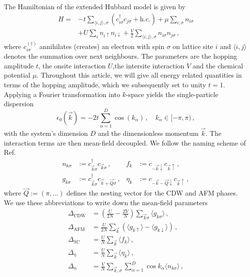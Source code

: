 \documentclass[iicol,sn-mathphys,Numbered]{sn-jnl}%
\theoremstyle{thmstyleone}%
\theoremstyle{thmstyletwo}%
\theoremstyle{thmstylethree}%
\begin{document}
The Hamiltonian of the extended Hubbard model is given by
\begin{equation}
    \begin{aligned}
        H = &-t \sum_{\langle i, j \rangle, \sigma} \left( c_{i\sigma}^\dagger c_{j\sigma} + \text{h.c.} \right) 
        + \mu \sum_{i,\sigma} n_{i\sigma} \\
        &+ U \sum_{i} n_{i\uparrow} n_{i\downarrow} 
        + \frac{V}{2} \sum_{\langle i, j\rangle, \sigma} n_{i\sigma} n_{j\sigma}\,,
    \end{aligned}
\end{equation}
where $c_{i\sigma}^{(\dagger)}$ annihilates (creates) an electron with spin $\sigma$ on lattice site $i$ and $\langle i, j\rangle$ denotes the summation over next neighbours.
The parameters are the hopping amplitude $t$, the onsite interaction $U$,the intersite interaction $V$ and the chemical potential $\mu$.
Throughout this article, we will give all energy related quantities in terms of the hopping amplitude, which we subsequently set to unity $t=1$.
Applying a Fourier transformation into $k$-space yields the single-particle dispersion 
\begin{equation}
    \epsilon_0 (\vec{k}) = -2t \sum_{\alpha=1}^D \cos(k_\alpha)\,,\quad k_\alpha \in [-\pi, \pi)\,,
\end{equation}
with the system's dimension $D$ and the dimensionless momentum $\vec{k}$.
The interaction terms are then mean-field decoupled. 
We follow the naming scheme of Ref. \cite{sentef17}
\begin{equation}
    \begin{aligned}
        n_{k\sigma} &:= c_{\vec{k}\sigma}^\dagger c_{\vec{k}\sigma}\,,          &f_k     &:= c_{-\vec{k}\downarrow} c_{\vec{k}\uparrow}\,, \\
        g_{k\sigma} &:= c_{\vec{k}\sigma}^\dagger c_{\vec{k}+\vec{Q}\sigma}\,,  &\eta_k  &:= c_{-\vec{k}-\vec{Q}\downarrow} c_{\vec{k}\uparrow}\,,
    \end{aligned}
\end{equation}
where $\vec{Q} := (\pi, ...)$ defines the nesting vector for the CDW and AFM phases.
We use these abbreviations to write down the mean-field parameters
\begin{subequations}
    \begin{align}
        \Delta_\text{CDW} &= \left(\frac{U}{2N} - \frac{ZV}{N}\right) \sum_{\vec{k}\sigma} \langle g_{k\sigma} \rangle\,, \\
        \Delta_\text{AFM} &= \frac{U}{2N} \sum_{\vec{k}} \left( \langle g_{k\uparrow} \rangle - \langle g_{k\downarrow} \rangle \right)\,, \\
        \Delta_\text{SC} &= \frac{U}{N} \sum_{\vec{k}} \langle f_k \rangle\,, \\
        \Delta_\eta &= \frac{U}{N} \sum_{\vec{k}} \langle \eta_k \rangle\,, \\
        \Delta_n &= \frac{V}{N} \sum_{\vec{k},\sigma} \sum_{\alpha=1}^D \cos k_\alpha \langle n_{k\sigma} \rangle\,,
    \end{align}
\end{subequations}
\end{document}
